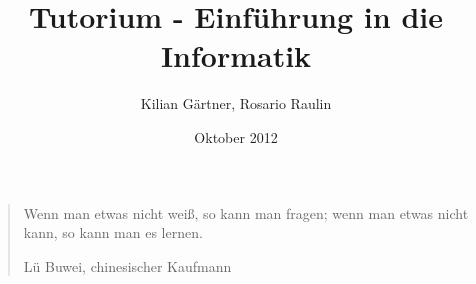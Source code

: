 \documentclass[12pt]{beamer}
\title{Tutorium - Einführung in die Informatik}
\author{Kilian Gärtner, Rosario Raulin}
\date{Oktober 2012}
\begin{document}
\begin{frame}

	\begin{quote}
		Wenn man etwas nicht weiß, so kann man fragen; wenn man etwas nicht
		kann, so kann man es lernen.
		\newline
		\begin{flushright}
		\scriptsize Lü Buwei, chinesischer Kaufmann
		\end{flushright}
	\end{quote}

\end{frame}

\frame{\titlepage}
\end{document}
